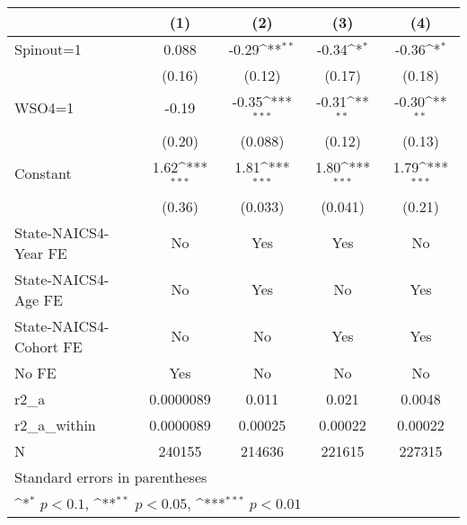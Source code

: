 {
\def\sym#1{\ifmmode^{#1}\else\(^{#1}\)\fi}
\begin{tabular}{l*{4}{c}}
\hline\hline
                    &\multicolumn{1}{c}{(1)}         &\multicolumn{1}{c}{(2)}         &\multicolumn{1}{c}{(3)}         &\multicolumn{1}{c}{(4)}         \\
\hline
Spinout=1           &       0.088         &       -0.29\sym{**} &       -0.34\sym{*}  &       -0.36\sym{*}  \\
                    &      (0.16)         &      (0.12)         &      (0.17)         &      (0.18)         \\
[1em]
WSO4=1              &       -0.19         &       -0.35\sym{***}&       -0.31\sym{**} &       -0.30\sym{**} \\
                    &      (0.20)         &     (0.088)         &      (0.12)         &      (0.13)         \\
[1em]
Constant            &        1.62\sym{***}&        1.81\sym{***}&        1.80\sym{***}&        1.79\sym{***}\\
                    &      (0.36)         &     (0.033)         &     (0.041)         &      (0.21)         \\
[1em]
State-NAICS4-Year FE&          No         &         Yes         &         Yes         &          No         \\
[1em]
State-NAICS4-Age FE &          No         &         Yes         &          No         &         Yes         \\
[1em]
State-NAICS4-Cohort FE&          No         &          No         &         Yes         &         Yes         \\
[1em]
No FE               &         Yes         &          No         &          No         &          No         \\
\hline
r2\_a                &   0.0000089         &       0.011         &       0.021         &      0.0048         \\
r2\_a\_within         &   0.0000089         &     0.00025         &     0.00022         &     0.00022         \\
N                   &      240155         &      214636         &      221615         &      227315         \\
\hline\hline
\multicolumn{5}{l}{\footnotesize Standard errors in parentheses}\\
\multicolumn{5}{l}{\footnotesize \sym{*} \(p<0.1\), \sym{**} \(p<0.05\), \sym{***} \(p<0.01\)}\\
\end{tabular}
}
